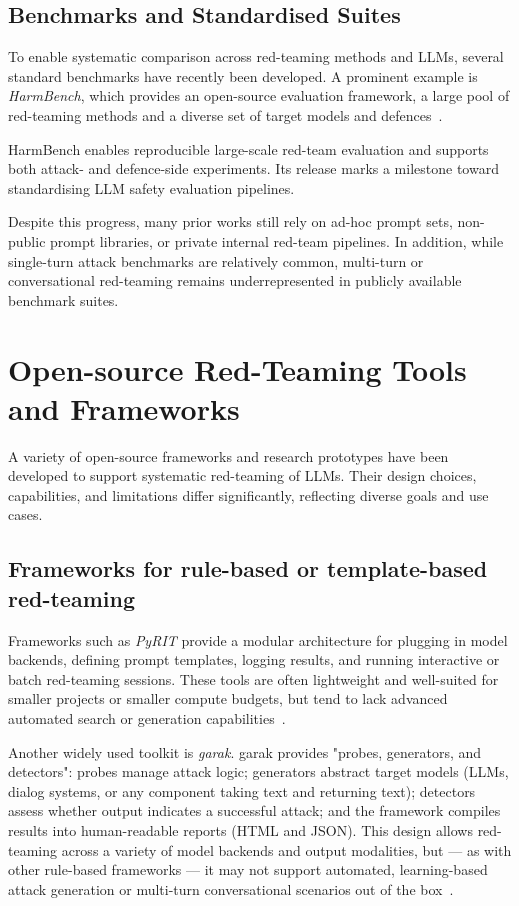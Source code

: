 \subsection{Benchmarks and Standardised Suites}\label{subsec:benchmarks}

To enable systematic comparison across red-teaming methods and LLMs, several standard benchmarks have recently been developed.
A prominent example is {\em HarmBench}, which provides an open-source evaluation framework, a large pool of red-teaming methods and a diverse set of target models and defences~\cite{mazeika2024harmbench}.

HarmBench enables reproducible large-scale red-team evaluation and supports both attack- and defence-side experiments.
Its release marks a milestone toward standardising LLM safety evaluation pipelines.

Despite this progress, many prior works still rely on ad-hoc prompt sets, non-public prompt libraries, or private internal red-team pipelines.
In addition, while single-turn attack benchmarks are relatively common, multi-turn or conversational red-teaming remains underrepresented in publicly available benchmark suites.

\section{Open-source Red-Teaming Tools and Frameworks}\label{sec:tool-survey}

A variety of open-source frameworks and research prototypes have been developed to support systematic red-teaming of LLMs.
Their design choices, capabilities, and limitations differ significantly, reflecting diverse goals and use cases.

\newpage{}

\subsection{Frameworks for rule-based or template-based red-teaming}\label{subsec:pyrit-garak}

Frameworks such as {\em PyRIT} provide a modular architecture for plugging in model backends, defining prompt templates, logging results, and running interactive or batch red-teaming sessions.
These tools are often lightweight and well-suited for smaller projects or smaller compute budgets, but tend to lack advanced automated search or generation capabilities~\cite{munoz2024pyrit}.

Another widely used toolkit is {\em garak}.
garak provides "probes, generators, and detectors": probes manage attack logic; generators abstract target models (LLMs, dialog systems, or any component taking text and returning text); detectors assess whether output indicates a successful attack; and the framework compiles results into human-readable reports (HTML and JSON).
This design allows red-teaming across a variety of model backends and output modalities, but — as with other rule-based frameworks — it may not support automated, learning-based attack generation or multi-turn conversational scenarios out of the box~\cite{derczynski2024garak}.

